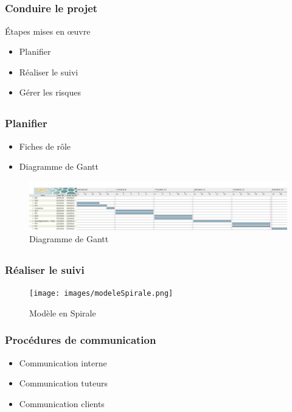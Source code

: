\subsection{} %

\begin{frame}
\frametitle{Conduire le projet}
Étapes mises en \oe{}uvre
	\begin{itemize}
		\item Planifier
		\item Réaliser le suivi
		\item Gérer les risques
	\end{itemize}
\end{frame}

\subsection{}

\begin{frame}
\frametitle{Planifier}
\begin{itemize}
	\item Fiches de rôle
	\item Diagramme de Gantt
\end{itemize}
\begin{figure}
\begin{center}
	\includegraphics[scale=0.15]{images/exempleGantt.jpg}
	\caption{Diagramme de Gantt}
	\label{DG}
\end{center}
\end{figure}
\end{frame}

\subsection{}

\begin{frame}
\frametitle{Réaliser le suivi}
\begin{figure}
\begin{center}
\texttt{[image: images/modeleSpirale.png]}
\caption{Modèle en Spirale}
\label{MS}
\end{center}
\end{figure}
\end{frame}

\begin{frame}
\frametitle{Procédures de communication}
\begin{itemize}
\item Communication interne
\item Communication tuteurs
\item Communication clients
\end{itemize}
\end{frame}